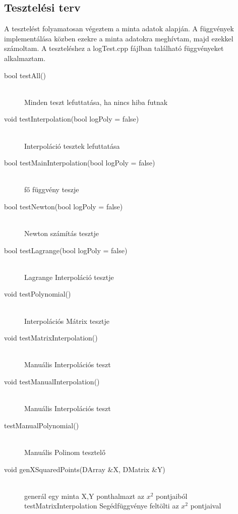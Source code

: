 \subsection{Tesztelési terv}
	A tesztelést folyamatosan végeztem a minta adatok alapján. A függvények implementálása közben ezekre a minta adatokra meghívtam, majd ezekkel számoltam. A teszteléshez a logTest.cpp fájlban található függvényeket alkalmaztam. 
	\begin{description}
		\item[bool testAll()] \hfill \\ 
			Minden teszt lefuttatása, ha nincs hiba futnak
		\item[void testInterpolation(bool logPoly = false)] \hfill \\ 
		Interpoláció tesztek lefuttatása
		\item[bool testMainInterpolation(bool logPoly = false)] \hfill \\ 
		fő függvény teszje
		\item[bool testNewton(bool logPoly = false)] \hfill \\ 
		Newton számítás tesztje
		\item[bool testLagrange(bool logPoly = false)] \hfill \\ 
		Lagrange Interpoláció tesztje
		\item[void testPolynomial()] \hfill \\ 
		 Interpolációs Mátrix tesztje
		\item[void testMatrixInterpolation()] \hfill \\ 
		Manuális Interpolációs teszt
		\item[void testManualInterpolation()] \hfill \\ 
		Manuális Interpolációs teszt

		\item[testManualPolynomial()] \hfill \\ 
		Manuális Polinom tesztelő 
		\item[void genXSquaredPoints(DArray \&X, DMatrix \&Y)] \hfill \\ 
		generál egy minta X,Y ponthalmazt az $x^{2}$ 
		pontjaiból
		testMatrixInterpolation Segédfüggvénye
		feltölti az $x^{2}$ pontjaival 
	\end{description}

	\begin{description}
	\end{description}
